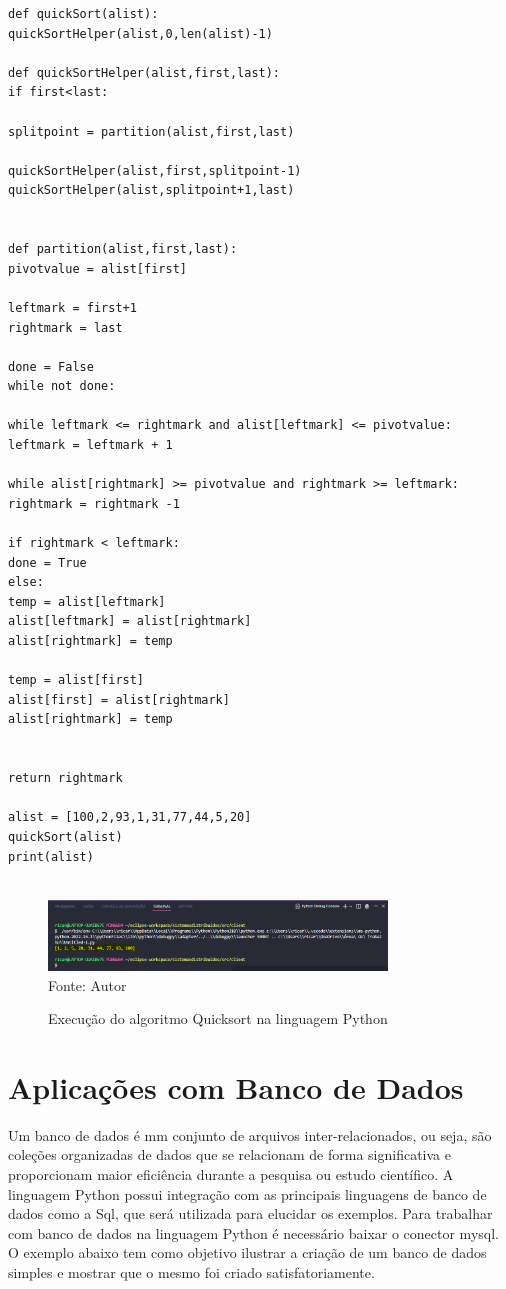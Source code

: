\begin{lstlisting}
def quickSort(alist):
quickSortHelper(alist,0,len(alist)-1)

def quickSortHelper(alist,first,last):
if first<last:

splitpoint = partition(alist,first,last)

quickSortHelper(alist,first,splitpoint-1)
quickSortHelper(alist,splitpoint+1,last)


def partition(alist,first,last):
pivotvalue = alist[first]

leftmark = first+1
rightmark = last

done = False
while not done:

while leftmark <= rightmark and alist[leftmark] <= pivotvalue:
leftmark = leftmark + 1

while alist[rightmark] >= pivotvalue and rightmark >= leftmark:
rightmark = rightmark -1

if rightmark < leftmark:
done = True
else:
temp = alist[leftmark]
alist[leftmark] = alist[rightmark]
alist[rightmark] = temp

temp = alist[first]
alist[first] = alist[rightmark]
alist[rightmark] = temp


return rightmark

alist = [100,2,93,1,31,77,44,5,20]
quickSort(alist)
print(alist)
	
\end{lstlisting}

\begin{figure}[H]
	\begin{center}
		\caption{Execução do algoritmo Quicksort na linguagem Python} \label{ling1}
		\includegraphics[width=9cm]{quicksort.PNG} \\
		{\tiny \sf Fonte:{ Autor}}
	\end{center}
\end{figure}

    \section{Aplica\c{c}\~{o}es com Banco de Dados}
Um banco de dados é mm conjunto de arquivos inter-relacionados, ou seja, são coleções organizadas de dados que se relacionam de forma significativa e proporcionam maior eficiência durante a pesquisa ou estudo científico. A linguagem Python possui integração com as principais linguagens de banco de dados como a Sql, que será utilizada para elucidar os exemplos. Para trabalhar com banco de dados na linguagem Python é necessário baixar o conector mysql. O exemplo abaixo tem como objetivo ilustrar a criação de um banco de dados simples e mostrar que o mesmo foi criado satisfatoriamente.

